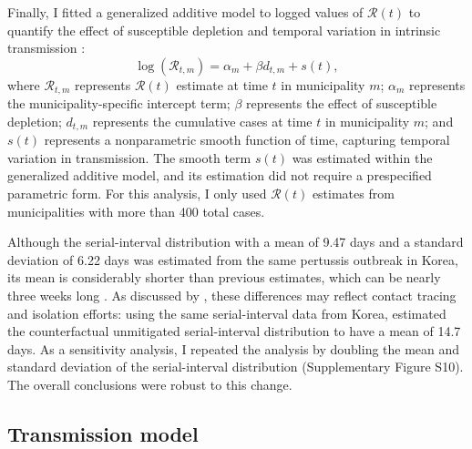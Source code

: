 \documentclass[12pt]{article}
\begin{document}
Finally, I fitted a generalized additive model to logged values of $\mathcal R(t)$ to quantify the effect of susceptible depletion and temporal variation in intrinsic transmission \citep{te2013driving,wood2017generalized,kissler2020projecting}:
\begin{equation}
\log \left(\mathcal R_{t,m}\right) = \alpha_m + \beta d_{t,m} + s(t),
\end{equation}
where $\mathcal R_{t,m}$ represents $\mathcal R(t)$ estimate at time $t$ in municipality $m$;
$\alpha_m$ represents the municipality-specific intercept term;
$\beta$ represents the effect of susceptible depletion;
$d_{t,m}$ represents the cumulative cases at time $t$ in municipality $m$;
and $s(t)$ represents a nonparametric smooth function of time, capturing temporal variation in transmission.
The smooth term $s(t)$ was estimated within the generalized additive model, and its estimation did not require a prespecified parametric form.
For this analysis, I only used $\mathcal R(t)$ estimates from municipalities with more than 400 total cases.

Although the serial-interval distribution with a mean of 9.47 days and a standard deviation of 6.22 days was estimated from the same pertussis outbreak in Korea, its mean is considerably shorter than previous estimates, which can be nearly three weeks long \citep{te2014estimation}.
As discussed by \cite{akhmetzhanov2026serial}, these differences may reflect contact tracing and isolation efforts:
using the same serial-interval data from Korea, \cite{akhmetzhanov2026serial} estimated the counterfactual unmitigated serial-interval distribution to have a mean of 14.7 days.
As a sensitivity analysis, I repeated the analysis by doubling the mean and standard deviation of the serial-interval distribution (Supplementary Figure S10).
The overall conclusions were robust to this change.

\subsection*{Transmission model}
\end{document}
